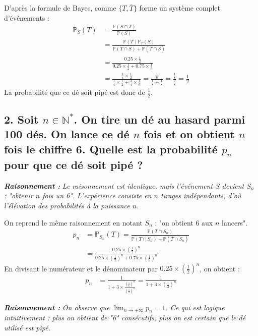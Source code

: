 \documentclass[11pt,a4paper]{article}
\newcommand{\explication}[1]{
    \vspace{0.2cm}
    \noindent\textcolor{blue!80!black}{
        \textbf{\textit{Raisonnement : }} \textit{#1}
    }
    \vspace{0.2cm}
}
\begin{document}
D'après la formule de Bayes, comme $\{T, \overline{T}\}$ forme un système complet d'événements :
\begin{align*}
    \mathbb{P}_S(T) &= \frac{\mathbb{P}(S \cap T)}{\mathbb{P}(S)} \\
    &= \frac{\mathbb{P}(T)\mathbb{P}_T(S)}{\mathbb{P}(T \cap S) + \mathbb{P}(\overline{T} \cap S)} \\
    &= \frac{0.25 \times \frac{1}{2}}{0.25 \times \frac{1}{2} + 0.75 \times \frac{1}{6}} \\
    &= \frac{\frac{1}{4} \times \frac{1}{2}}{\frac{1}{4} \times \frac{1}{2} + \frac{3}{4} \times \frac{1}{6}} = \frac{\frac{1}{8}}{\frac{1}{8} + \frac{1}{8}} = \frac{\frac{1}{8}}{\frac{2}{8}} = \frac{1}{2}
\end{align*}
La probabilité que ce dé soit pipé est donc de $\frac{1}{2}$.

\subsection*{2. Soit $n \in \mathbb{N}^*$. On tire un dé au hasard parmi 100 dés. On lance ce dé $n$ fois et on obtient $n$ fois le chiffre 6. Quelle est la probabilité $p_n$ pour que ce dé soit pipé ?}

\explication{Le raisonnement est identique, mais l'événement $S$ devient $S_n$ : "obtenir $n$ fois un 6". L'expérience consiste en $n$ tirages indépendants, d'où l'élévation des probabilités à la puissance $n$.}

On reprend le même raisonnement en notant $S_n$ : "on obtient 6 aux $n$ lancers".
\begin{align*}
    p_n &= \mathbb{P}_{S_n}(T) = \frac{\mathbb{P}(T \cap S_n)}{\mathbb{P}(T \cap S_n) + \mathbb{P}(\overline{T} \cap S_n)} \\
    &= \frac{0.25 \times \left(\frac{1}{2}\right)^n}{0.25 \times \left(\frac{1}{2}\right)^n + 0.75 \times \left(\frac{1}{6}\right)^n}
\end{align*}
En divisant le numérateur et le dénominateur par $0.25 \times \left(\frac{1}{2}\right)^n$, on obtient :
\begin{align*}
    p_n &= \frac{1}{1 + 3 \times \frac{\left(\frac{1}{6}\right)^n}{\left(\frac{1}{2}\right)^n}} = \frac{1}{1 + 3 \times \left(\frac{1}{3}\right)^n}
\end{align*}
\explication{On observe que $\lim_{n \to +\infty} p_n = 1$. Ce qui est logique intuitivement : plus on obtient de "6" consécutifs, plus on est certain que le dé utilisé est pipé.}
\end{document}

